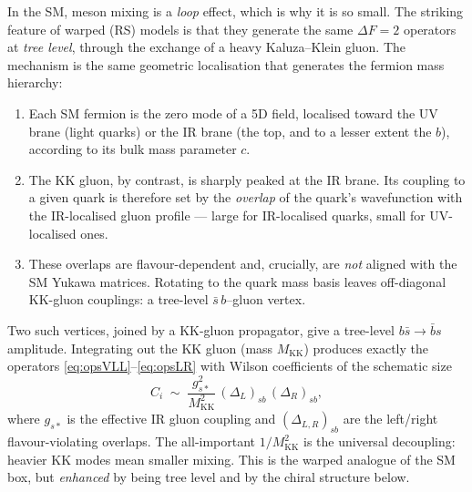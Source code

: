 \documentclass[11pt]{article}
\newcommand{\MKK}{M_{\mathrm{KK}}}
\theoremstyle{definition}
\begin{document}
In the SM, meson mixing is a \emph{loop} effect, which is why it is so small. The
striking feature of warped (RS) models is that they generate the same
$\Delta F=2$ operators at \emph{tree level}, through the exchange of a heavy
Kaluza--Klein gluon. The mechanism is the same geometric localisation that
generates the fermion mass hierarchy:
\begin{enumerate}[leftmargin=1.6em]
\item Each SM fermion is the zero mode of a 5D field, localised toward the UV
brane (light quarks) or the IR brane (the top, and to a lesser extent the $b$),
according to its bulk mass parameter $c$.
\item The KK gluon, by contrast, is sharply peaked at the IR brane. Its coupling
to a given quark is therefore set by the \emph{overlap} of the quark's
wavefunction with the IR-localised gluon profile --- large for IR-localised
quarks, small for UV-localised ones.
\item These overlaps are flavour-dependent and, crucially, are \emph{not}
aligned with the SM Yukawa matrices. Rotating to the quark mass basis leaves
off-diagonal KK-gluon couplings: a tree-level $\bar s\, b$--gluon vertex.
\end{enumerate}
Two such vertices, joined by a KK-gluon propagator, give a tree-level
$b\bar s\to \bar b s$ amplitude. Integrating out the KK gluon (mass $\MKK$)
produces exactly the operators \eqref{eq:opsVLL}--\eqref{eq:opsLR} with Wilson
coefficients of the schematic size
\begin{equation}
C_i \;\sim\; \frac{g_{s*}^2}{\MKK^2}\,(\Delta_L)_{sb}\,(\Delta_R)_{sb},
\label{eq:Cscale}
\end{equation}
where $g_{s*}$ is the effective IR gluon coupling and $(\Delta_{L,R})_{sb}$ are
the left/right flavour-violating overlaps. The all-important $1/\MKK^2$ is the
universal decoupling: heavier KK modes mean smaller mixing. This is the
warped analogue of the SM box, but \emph{enhanced} by being tree level and by the
chiral structure below.
\end{document}
